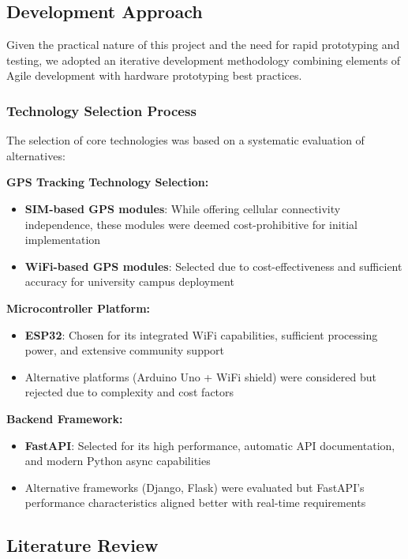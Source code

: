\documentclass[12pt,a4paper]{article}
\begin{document}
\subsection{Development Approach}

Given the practical nature of this project and the need for rapid prototyping and testing, we adopted an iterative development methodology combining elements of Agile development with hardware prototyping best practices.

\subsubsection{Technology Selection Process}

The selection of core technologies was based on a systematic evaluation of alternatives:

\textbf{GPS Tracking Technology Selection:}
\begin{itemize}
    \item \textbf{SIM-based GPS modules}: While offering cellular connectivity independence, these modules were deemed cost-prohibitive for initial implementation
    \item \textbf{WiFi-based GPS modules}: Selected due to cost-effectiveness and sufficient accuracy for university campus deployment
\end{itemize}

\textbf{Microcontroller Platform:}
\begin{itemize}
    \item \textbf{ESP32}: Chosen for its integrated WiFi capabilities, sufficient processing power, and extensive community support
    \item Alternative platforms (Arduino Uno + WiFi shield) were considered but rejected due to complexity and cost factors
\end{itemize}

\textbf{Backend Framework:}
\begin{itemize}
    \item \textbf{FastAPI}: Selected for its high performance, automatic API documentation, and modern Python async capabilities
    \item Alternative frameworks (Django, Flask) were evaluated but FastAPI's performance characteristics aligned better with real-time requirements
\end{itemize}

\subsection{Literature Review}
\end{document}
